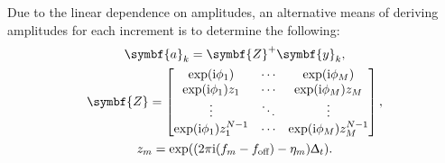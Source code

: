 Due to the linear dependence on amplitudes, an alternative means of
deriving amplitudes for each increment is to determine the following:
\begin{subequations}
    \begin{gather}
        \symbf{a}_k = \symbf{Z}^+ \symbf{y}_k, \\
        \symbf{Z} =
        \begin{bmatrix}
            \exp(\iu \phi_1) & \cdots & \exp(\iu \phi_M) \\
            \exp(\iu \phi_1) z_1 & \cdots & \exp(\iu \phi_M) z_M\\
            \vdots & \ddots & \vdots \\
            \exp(\iu \phi_1) z_1^{N-1} & \cdots & \exp(\iu \phi_M) z_M^{N-1}
        \end{bmatrix},\\
        z_m = \exp((2\pi \iu (f_m - \foff) - \eta_m)\Dt).
    \end{gather}
\end{subequations}


